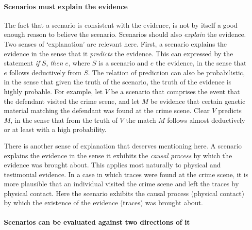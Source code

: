\documentclass[10pt]{article}
\begin{document}
\paragraph{Scenarios must explain the evidence}

The fact that a scenario is consistent 
with the evidence, is not by itself a good enough reason to believe the scenario. 
Scenarios should also \textit{explain} the evidence. 
Two senses of `explanation' are relevant here. First, 
a scenario explains the evidence in the sense that it \textit{predicts} the evidence. 
This can expressed by the statement \textit{if} $S$, \textit{then} $e$, 
where $S$ is a scenario and $e$ the evidence, in the sense that $e$ 
follows deductively from $S$. The relation of prediction can also be probabilistic, in the sense that given the truth of the scenario, 
the truth of the evidence is highly probable. 
For example, let $V$ be a scenario that comprises the event that the defendant visited the crime scene, and let $M$ be 
evidence that certain genetic material matching the defendant 
was found at the crime scene. Clear $V$ predicts $M$, in the sense that from the truth of $V$
 the match $M$ follows almost deductively or at least with a high probability.  

There is another sense of explanation that deserves mentioning here. 
A scenario explains the evidence in the sense it exhibits the \textit{causal process} by which the evidence 
was brought about. This applies most naturally to physical and testimonial evidence. 
In a case in which traces were found at the crime scene, 
it is more plausible that an individual visited the crime scene 
and left the traces by physical contact. Here the scenario exhibits the causal process (physical contact) 
by which the existence of the evidence 
(traces) was brought about. 

\paragraph{Scenarios can be evaluated against two directions of it}
\end{document}
